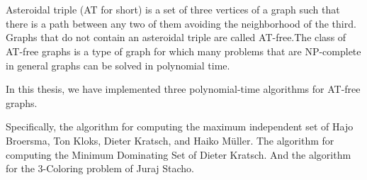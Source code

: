 \chapter*{\csebilabstract}
\addstarredchapter{\csebilabstract} %
\makecsebilabstract

\noindent Asteroidal triple (AT for short) is a set of three vertices of a graph such that there is a path between any two of them avoiding the neighborhood of the third. Graphs that do not contain an asteroidal triple are called AT-free.The class of AT-free graphs is a type of graph for which many problems that are NP-complete in general graphs can be solved in polynomial time.

In this thesis, we have implemented three polynomial-time algorithms for AT-free graphs.

Specifically, the algorithm for computing the maximum independent set of Hajo Broersma, Ton Kloks, Dieter Kratsch, and Haiko Müller\cite{at-free-independent-sets}. The algorithm for computing the Minimum Dominating Set of Dieter Kratsch\cite{at-free-independent-sets}. And the algorithm for the 3-Coloring problem of Juraj Stacho\cite{at-free-3-colouring}. 